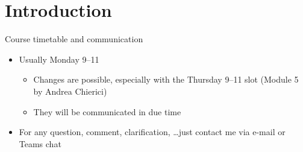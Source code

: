 
\section*{Introduction}

\begin{frame}{Course timetable and communication}
  \begin{itemize}
  \item Usually Monday 9--11

    \begin{itemize}
    \item Changes are possible, especially with the Thursday 9--11 slot (Module
      5 by Andrea Chierici)
    \item They will be communicated in due time
    \end{itemize}
  \item For any question, comment, clarification, \ldots just contact me via
    e-mail or Teams chat
  \end{itemize}
\end{frame}

